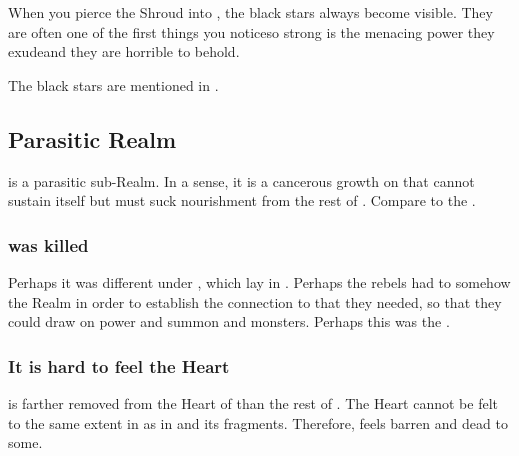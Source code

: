 When you pierce the Shroud into \Nyx, the black stars always become visible. They are often one of the first things you notice\dash so strong is the menacing power they exude\dash and they are horrible to behold. 

The black stars are mentioned in \emph{}. 


















\subsection{Parasitic Realm}
\Nyx{} is a parasitic sub-Realm. 
In a sense, it is a cancerous growth on \Miith{} that cannot sustain itself but must suck nourishment from the rest of \Miith{}. 
Compare to the . 





\subsubsection{\Nyx{} was killed}
Perhaps it was different under , which lay in \Nyx. 
Perhaps the rebels had to somehow  the Realm in order to establish the connection to \Erebos{} that they needed, so that they could draw on \Erebean{} power and summon \banes{} and monsters. 
Perhaps this was the . 




\subsubsection{It is hard to feel the Heart}
\Nyx{} is farther removed from the Heart of \Miith{} than the rest of \Miith{}. 
The Heart cannot be felt to the same extent in \Nyx{} as in  and its fragments. 
Therefore, \Nyx{} feels barren and dead to some. 


